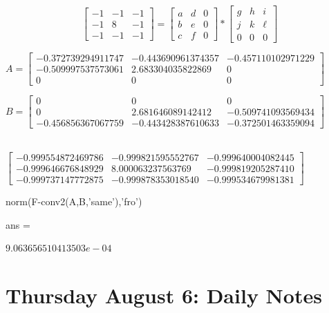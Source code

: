 \documentclass[12pt]{amsart}
\theoremstyle{definition}
\theoremstyle{remark}
\numberwithin{thm}{section}
\begin{document}
$$
\begin{bmatrix}
-1 & -1 & -1\\
-1 & 8 & -1\\
-1 & -1 & -1
\end{bmatrix}
=
\begin{bmatrix}
a & d & 0\\
b & e & 0\\
c & f & 0
\end{bmatrix} *
\begin{bmatrix}
g & h & i\\
j & k & \ell \\
0 & 0 & 0
\end{bmatrix}
$$

$
A =
\begin{bmatrix}
  -0.372739294911747  &-0.443690961374357 & -0.457110102971229\\
  -0.509997537573061  & 2.683304035822869 &                  0\\
                   0  &                 0 &                  0
\end{bmatrix}
$

$
B =
\begin{bmatrix}
                   0&                   0&                   0\\
                   0&   2.681646089142412&  -0.509741093569434\\
  -0.456856367067759&  -0.443428387610633&  -0.372501463359094
\end{bmatrix}
$

\\
$
\begin{bmatrix}
  -0.999554872469786  &-0.999821595552767  &-0.999640004082445\\
  -0.999646676848929  & 8.000063237563769  &-0.999819205287410\\
  -0.999737147772875  &-0.999878353018540  &-0.999534679981381
  \end{bmatrix}
$
  
  norm(F-conv2(A,B,'same'),'fro')

ans =

     $9.063656510413503e-04$



\section{Thursday August 6: Daily Notes}
\end{document}
